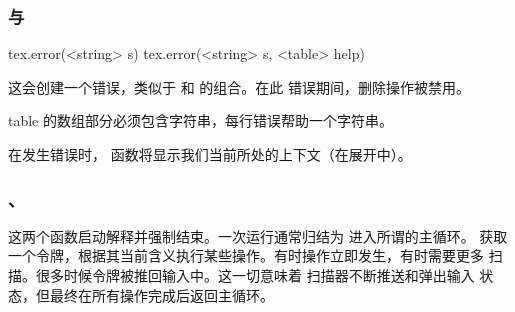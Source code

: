 %
%
%
%
%
%

\subsubsection{ 与 }



\begin{typing}
tex.error(<string> s)
tex.error(<string> s, <table> help)
\end{typing}

这会创建一个错误，类似于  和  的组合。在此
错误期间，删除操作被禁用。

 table 的数组部分必须包含字符串，每行错误帮助一个字符串。

在发生错误时， 函数将显示我们当前所处的上下文（在展开中）。

\subsubsection{、}


这两个函数启动解释并强制结束。一次运行通常归结为 \TEX 进入所谓的主循环。
获取一个令牌，根据其当前含义执行某些操作。有时操作立即发生，有时需要更多
扫描。很多时候令牌被推回输入中。这一切意味着 \TEX 扫描器不断推送和弹出输入
状态，但最终在所有操作完成后返回主循环。

\subsubsection{}

